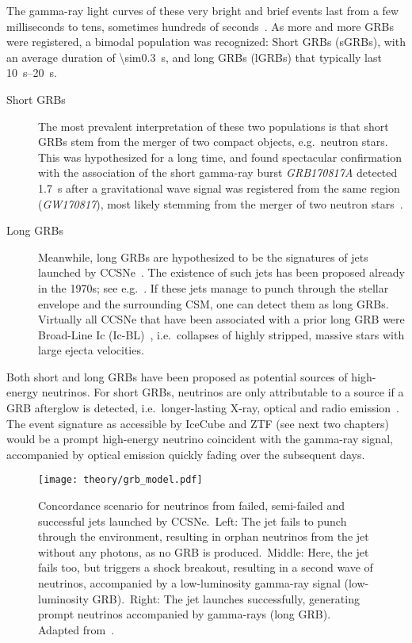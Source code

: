 The gamma-ray light curves of these very bright and brief events last from a few milliseconds to tens, sometimes hundreds of seconds~. As more and more GRBs were registered, a bimodal population was recognized: Short GRBs (sGRBs), with an average duration of \SI{\sim0.3}{\s}, and long GRBs (lGRBs) that typically last \SIrange{10}{20}{\s}.

\begin{description}
    \item[Short GRBs] The most prevalent interpretation of these two populations is that short GRBs stem from the merger of two compact objects, e.g.~neutron stars. This was hypothesized for a long time, and found spectacular confirmation with the association of the short gamma-ray burst \textit{GRB170817A} detected \SI{1.7}{\s} after a gravitational wave signal was registered from the same region (\textit{GW170817}), most likely stemming from the merger of two neutron stars~.

    \item[Long GRBs] Meanwhile, long GRBs are hypothesized to be the signatures of jets launched by CCSNe~. The existence of such jets has been proposed already in the 1970s; see e.g.~. If these jets manage to punch through the stellar envelope and the surrounding CSM, one can detect them as long GRBs. Virtually all CCSNe that have been associated with a prior long GRB were Broad-Line Ic (Ic-BL)~, i.e.\ collapses of highly stripped, massive stars with large ejecta velocities.
\end{description}

Both short and long GRBs have been proposed as potential sources of high-energy neutrinos. For short GRBs, neutrinos are only attributable to a source if a GRB afterglow is detected, i.e.\ longer-lasting X-ray, optical and radio emission~. The event signature as accessible by IceCube and ZTF (see next two chapters) would be a prompt high-energy neutrino coincident with the gamma-ray signal, accompanied by optical emission quickly fading over the subsequent days.

\begin{figure*}[htb]
    \texttt{[image: theory/grb\_model.pdf]}
    \caption[High-energy neutrinos from GRBs]{Concordance scenario for neutrinos from failed, semi-failed and successful jets launched by CCSNe.\ Left: The jet fails to punch through the environment, resulting in orphan neutrinos from the jet without any photons, as no GRB is produced.\ Middle: Here, the jet fails too, but triggers a shock breakout, resulting in a second wave of neutrinos, accompanied by a low-luminosity gamma-ray signal (low-luminosity GRB).\ Right: The jet launches successfully, generating prompt neutrinos accompanied by gamma-rays (long GRB). Adapted from~\cite{Senno2016}.}
\end{figure*}

